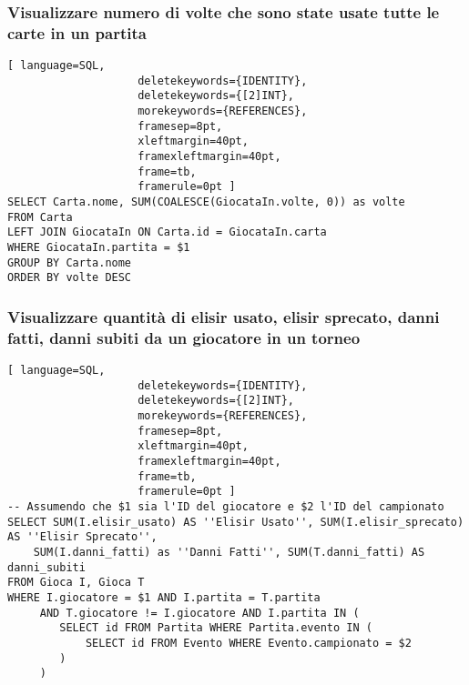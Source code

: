 \documentclass{article}
\begin{document}
\subsubsection{Visualizzare numero di volte che sono state usate tutte le carte in un partita}
\begin{lstlisting}[ language=SQL,
                    deletekeywords={IDENTITY},
                    deletekeywords={[2]INT},
                    morekeywords={REFERENCES},
                    framesep=8pt,
                    xleftmargin=40pt,
                    framexleftmargin=40pt,
                    frame=tb,
                    framerule=0pt ]
SELECT Carta.nome, SUM(COALESCE(GiocataIn.volte, 0)) as volte
FROM Carta
LEFT JOIN GiocataIn ON Carta.id = GiocataIn.carta 
WHERE GiocataIn.partita = $1
GROUP BY Carta.nome
ORDER BY volte DESC
\end{lstlisting}

\subsubsection{Visualizzare quantità di elisir usato, elisir sprecato, danni fatti, danni subiti da un giocatore in un torneo}
\begin{lstlisting}[ language=SQL,
                    deletekeywords={IDENTITY},
                    deletekeywords={[2]INT},
                    morekeywords={REFERENCES},
                    framesep=8pt,
                    xleftmargin=40pt,
                    framexleftmargin=40pt,
                    frame=tb,
                    framerule=0pt ]
-- Assumendo che $1 sia l'ID del giocatore e $2 l'ID del campionato
SELECT SUM(I.elisir_usato) AS ''Elisir Usato'', SUM(I.elisir_sprecato) AS ''Elisir Sprecato'', 
    SUM(I.danni_fatti) as ''Danni Fatti'', SUM(T.danni_fatti) AS danni_subiti
FROM Gioca I, Gioca T
WHERE I.giocatore = $1 AND I.partita = T.partita
     AND T.giocatore != I.giocatore AND I.partita IN (
        SELECT id FROM Partita WHERE Partita.evento IN (
            SELECT id FROM Evento WHERE Evento.campionato = $2
        )
     )
\end{lstlisting}
\end{document}
